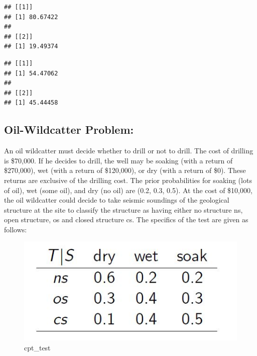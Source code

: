 \documentclass[
]{article}
\newenvironment{Shaded}{\begin{snugshade}}{\end{snugshade}}
\newcommand{\ControlFlowTok}[1]{\textcolor[rgb]{0.13,0.29,0.53}{\textbf{#1}}}
\newcommand{\FunctionTok}[1]{\textcolor[rgb]{0.00,0.00,0.00}{#1}}
\newcommand{\NormalTok}[1]{#1}
\newcommand{\SpecialCharTok}[1]{\textcolor[rgb]{0.00,0.00,0.00}{#1}}
\newcommand{\StringTok}[1]{\textcolor[rgb]{0.31,0.60,0.02}{#1}}
\begin{document}
\begin{Shaded}
\end{Shaded}

\begin{verbatim}
## [[1]]
## [1] 80.67422
## 
## [[2]]
## [1] 19.49374
\end{verbatim}

\begin{Shaded}
\end{Shaded}

\begin{verbatim}
## [[1]]
## [1] 54.47062
## 
## [[2]]
## [1] 45.44458
\end{verbatim}

\hypertarget{oil-wildcatter-problem}{%
\subsection{Oil-Wildcatter Problem:}\label{oil-wildcatter-problem}}

An oil wildcatter must decide whether to drill or not to drill. The cost of drilling is \$70,000. If he decides to drill, the well may be soaking (with a return of \$270,000), wet (with a return of \$120,000), or dry (with a return of \$0). These returns are exclusive of the drilling cost. The prior probabilities for soaking (lots of oil), wet (some oil), and dry (no oil) are (0.2, 0.3, 0.5). At the cost of \$10,000, the oil wildcatter could decide to take seismic soundings of the geological structure at the site to classify the structure as having either no structure ns, open structure, os and closed structure cs. The specifics of the test are given as follows:

\begin{figure}
\centering
\includegraphics{data/cpt_test_soaking.JPG}
\caption{cpt\_test}
\end{figure}
\end{document}
